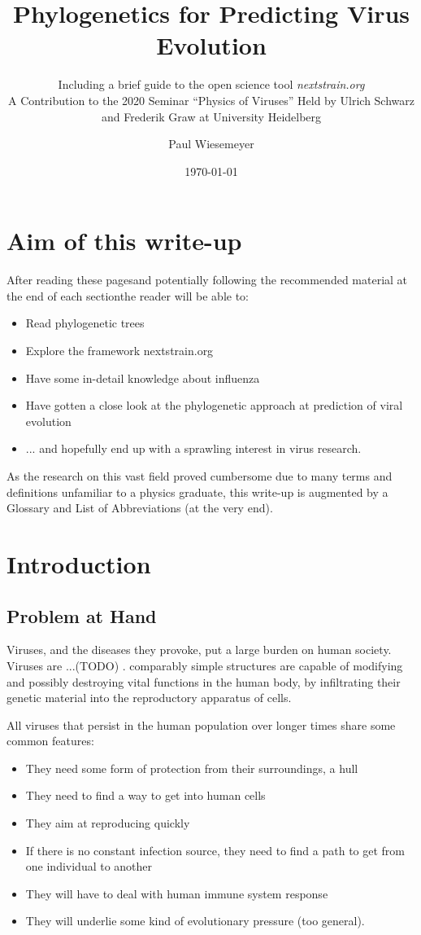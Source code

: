 \documentclass[12pt]{scrartcl}
\author{Paul Wiesemeyer}
\title{Phylogenetics for Predicting Virus Evolution}
\subtitle{Including a brief guide to the open science tool {\LARGE\textit{nextstrain.org}} \texorpdfstring{\\[1cm]}{,}A Contribution to the 2020 Seminar ``Physics of Viruses'' Held by Ulrich Schwarz and Frederik Graw at University Heidelberg }
\date{\today}
\newcommand{\red}[1]{{\color{red}#1}}
\begin{document}
\maketitle

\section*{Aim of this write-up}

  After reading these pages\textemdash and potentially following the recommended material at the end of each section\textemdash the reader will be able to:
  \begin{itemize}
    \item Read phylogenetic trees
    \item Explore the framework nextstrain.org
    \item Have some in-detail knowledge about influenza
    \item Have gotten a close look at the phylogenetic approach at prediction of viral evolution
    \item ... and hopefully end up with a sprawling interest in virus research.
  \end{itemize}

  As the research on this vast field proved cumbersome due to many terms and definitions unfamiliar to a physics graduate, this write-up is augmented by a Glossary and List of Abbreviations (at the very end).
\tableofcontents

\section{Introduction}

  \subsection{Problem at Hand}

    Viruses, and the diseases they provoke, put a large burden on human society. \red{Viruses are ...(TODO) .} comparably simple structures are capable of modifying and possibly destroying vital functions in the human body, by infiltrating their genetic material into the reproductory apparatus of cells.

    All viruses that persist in the human population over longer times share some common features:
    \begin{itemize}
      \item They need some form of protection from their surroundings, a hull
      \item They need to find a way to get into human cells
      \item They aim at reproducing quickly
      \item If there is no constant infection source, they need to find a path to get from one individual to another
      \item They will have to deal with human immune system response
      \item They will underlie some kind of evolutionary pressure (too general).
    \end{itemize}
\end{document}
